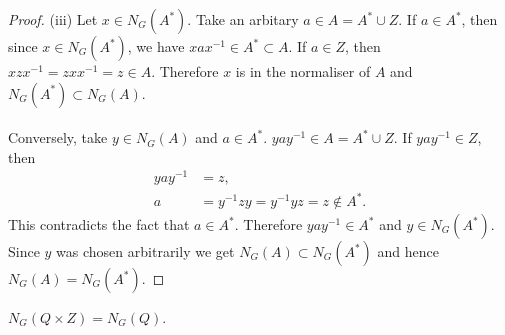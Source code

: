 \begin{proof}
(iii) Let $x \in N_G(A^*)$. Take an arbitary $a \in A = A^* \cup Z$. If $a \in A^*$, then since  $x \in N_G(A^*)$, we have $xax^{-1} \in A^* \subset A$. If $a \in Z$, then $xzx^{-1} = zxx^{-1} = z \in A$. Therefore $x$ is in the normaliser of $A$ and $N_G(A^*) \subset N_G(A)$. \\
\\
Conversely, take $y \in N_G(A)$ and $a \in A^*$. $yay^{-1} \in A = A^* \cup Z$. If  $yay^{-1} \in Z$, then
\begin{align*} yay^{-1} &= z, \tag{some $z \in Z$}
\\ a &= y^{-1}zy = y^{-1}yz = z \not \in A^*.
\end{align*}
This contradicts the fact that $a \in A^*$. Therefore $yay^{-1} \in A^*$ and $y \in N_G(A^*)$. Since $y$ was chosen arbitrarily we get $N_G(A) \subset N_G(A^*)$ and hence $N_G(A) =N_G(A^*)$.

\end{proof}

\begin{lemma}
\label{normalizer_Sylow_join_center_eq_normalizer_Sylow}
$N_G(Q \times Z) = N_G(Q)$.
\end{lemma}

